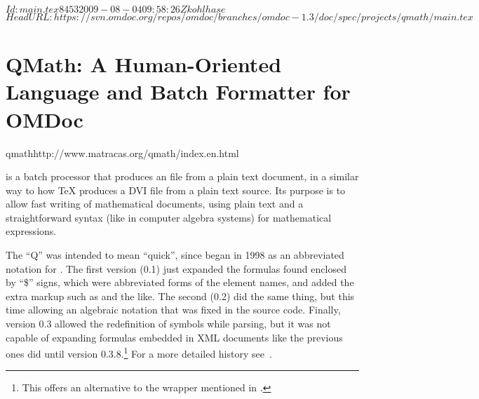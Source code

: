 \svnInfo $Id: main.tex 8453 2009-08-04 09:58:26Z kohlhase $
\svnKeyword $HeadURL: https://svn.omdoc.org/repos/omdoc/branches/omdoc-1.3/doc/spec/projects/qmath/main.tex $

\section[QMath Parser]{QMath: A Human-Oriented Language and Batch Formatter for
  OMDoc}

\begin{project}{qmath}{http://www.matracas.org/qmath/index.en.html}
\end{project}

{\qmath} is a batch processor that produces an {\omdoc} file from a plain {\unicode}
text document, in a similar way to how {\TeX} produces a DVI file from a plain
text source. Its purpose is to allow fast writing of mathematical
documents, using plain text and a straightforward syntax (like in computer algebra
systems) for mathematical expressions.

The ``Q'' was intended to mean ``quick'', since {\qmath} began in 1998 as an abbreviated
notation for {\mathml}. The first version (0.1) just expanded the formulas found enclosed
by ``{\$}'' signs, which were abbreviated forms of the {\mathml} element names, and added
the extra markup such as {} and the like. The second (0.2) did the same
thing, but this time allowing an algebraic notation that was fixed in the source code.
Finally, version 0.3 allowed the redefinition of symbols while parsing, but it was not
capable of expanding formulas embedded in XML documents like the previous ones did until
version 0.3.8.\footnote{\footnotesize{This offers an alternative to the {}
    wrapper mentioned in {}.}}  For a more detailed history
see~\cite{QMathHistory:URL}.

